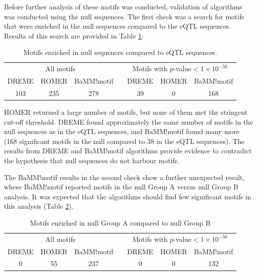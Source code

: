 \documentclass[12pt]{article}
\begin{document}
Before further analysis of these motifs was conducted, validation of algorithms was conducted using the null sequences. The first check was a search for motifs that were enriched in the null sequences compared to the eQTL sequences. Results of this search are provided in Table \ref{nullMotifNumbers}:

\begin{table}[!htbp]
\caption{Motifs enriched in null sequences compared to eQTL sequences.}
\label{nullMotifNumbers}
\centering
\begin{tabular}{ccccccc}
\toprule[0.2em]
\multicolumn{3}{c}{All motifs} & & \multicolumn{3}{c}{Motifs with $p$-value$<1\times10^{-50}$}\\
\cmidrule[0.1em]{1-3}
\cmidrule[0.1em]{5-7}
DREME & HOMER & BaMM!motif && DREME & HOMER & BaMM!motif\\
103 & 235 & 278 && 39 & 0 & 168\\
\bottomrule[0.2em]
\end{tabular}
\end{table}

HOMER returned a large number of motifs, but none of them met the stringent cut-off threshold. DREME found approximately the same number of motifs in the null sequences as in the eQTL sequences, and BaMM!motif found many more (168 significant motifs in the null compared to 38 in the eQTL sequences). The results from DREME and BaMM!motif algorithms provide evidence to contradict the hypothesis that null sequences do not harbour motifs. 


The BaMM!motif results in the second check show a further unexpected result, where BaMM!motif reported motifs in the null Group A versus null Group B analysis. It was expected that the algorithms should find few significant motifs in this analysis (Table \ref{nullHalfGroups}).

\begin{table}[!htbp]
\caption{Motifs enriched in null Group A compared to null Group B}
\label{nullHalfGroups}
\centering
\begin{tabular}{ccccccc}
\toprule[0.2em]
\multicolumn{3}{c}{All motifs} & & \multicolumn{3}{c}{Motifs with $p$-value$<1\times10^{-50}$}\\
\cmidrule[0.1em]{1-3}
\cmidrule[0.1em]{5-7}
DREME & HOMER & BaMM!motif && DREME & HOMER & BaMM!motif\\
0 & 55 & 237 && 0 & 0 & 132\\
\bottomrule[0.2em]
\end{tabular}
\end{table}
\end{document}

